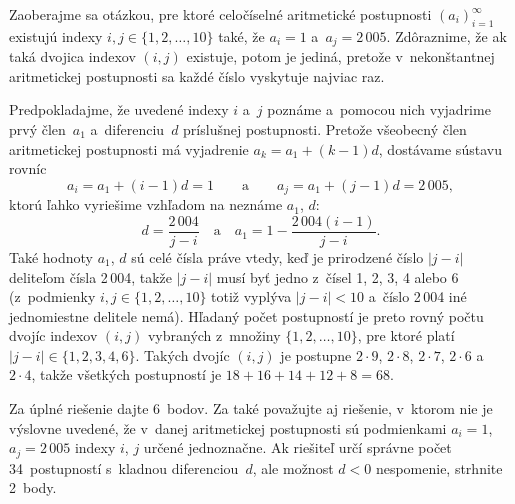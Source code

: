 {%
Zaoberajme sa otázkou, pre ktoré celočíselné aritmetické postupnosti
$\left(a_i\right)_{i=1}^{\infty}$  existujú indexy
$i,j\in\{1,2,\dots,10\}$ také, že $a_i=1$ a~$a_j=2\,005$.
Zdôraznime, že ak taká dvojica indexov $(i,j)$ existuje, potom je jediná,
pretože v~nekonštantnej aritmetickej postupnosti sa každé číslo vyskytuje najviac raz.

Predpokladajme, že uvedené indexy $i$ a~$j$ poznáme a~pomocou nich
vyjadrime prvý člen~$a_1$ a~diferenciu~$d$ príslušnej postupnosti.
Pretože všeobecný člen aritmetickej postupnosti
má vyjadrenie $a_k=a_1+(k-1)d$, dostávame sústavu rovníc
$$
a_i=a_1+(i-1)d=1\qquad\text{a}\qquad a_j=a_1+(j-1)d=2\,005,
$$
ktorú ľahko vyriešime vzhľadom na neznáme $a_1$, $d$:
$$
d=\frac{2\,004}{j-i}\quad\text{a}\quad a_1=1-\frac{2\,004(i-1)}{j-i}.
$$
Také hodnoty $a_1$, $d$ sú celé čísla práve vtedy, keď je
prirodzené číslo $|j-i|$ deliteľom čísla 2\,004, takže $|j-i|$
musí byť jedno z~čísel 1, 2, 3, 4 alebo 6 (z~podmienky
$i,j\in\{1,2,\dots,10\}$ totiž vyplýva $|j-i|<10$ a~číslo 2\,004
iné jednomiestne delitele nemá). Hľadaný počet postupností je
preto rovný počtu dvojíc indexov $(i,j)$ vybraných z~množiny
$\{1,2,\dots,10\}$, pre ktoré platí $|j-i|\in\{1,2,3,4,6\}$.
Takých dvojíc $(i,j)$ je postupne $2\cdot9$, $2\cdot8$,
$2\cdot7$, $2\cdot6$ a~$2\cdot4$, takže všetkých postupností je
$18+16+14+12+8=68$.


\nobreak\medskip\petit\noindent
Za úplné riešenie dajte 6~bodov.
Za také považujte aj riešenie, v~ktorom nie je výslovne uvedené,
že v~danej aritmetickej postupnosti sú podmienkami $a_i=1$,
$a_j=2\,005$ indexy $i$, $j$ určené jednoznačne. Ak riešiteľ
určí správne počet 34~postupností s~kladnou diferenciou~$d$,
ale možnost $d<0$ nespomenie, strhnite 2~body.
\endpetit
\bigbreak}

